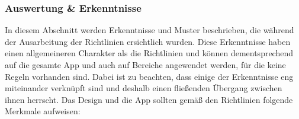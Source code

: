 \subsubsection{Auswertung \& Erkenntnisse}\label{subsection:design:erkenntnisse}%
In diesem Abschnitt werden Erkenntnisse und Muster beschrieben, die während der Ausarbeitung der Richtlinien ersichtlich wurden.\newline%
Diese Erkenntnisse haben einen allgemeineren Charakter als die Richtlinien und können dementsprechend auf die gesamte App und auch auf Bereiche angewendet werden, für die keine Regeln vorhanden sind.\newline%
Dabei ist zu beachten, dass einige der Erkenntnisse eng miteinander verknüpft sind und deshalb einen fließenden Übergang zwischen ihnen herrscht.%
%
\newline
\myNewSection
Das Design und die App sollten gemäß den Richtlinien folgende Merkmale aufweisen:

